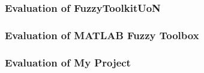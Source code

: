 	\subsubsection{Evaluation of FuzzyToolkitUoN}
	\subsubsection{Evaluation of MATLAB Fuzzy Toolbox} 	
	\subsubsection{Evaluation of My Project}	

